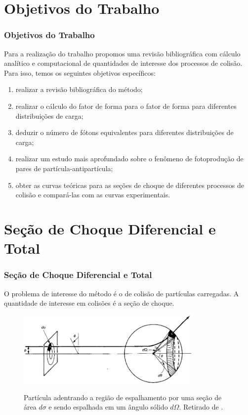 \documentclass[xcolor=dvipsnames]{beamer}
\begin{document}
\section{Objetivos do Trabalho}
\begin{frame}
	\frametitle{Objetivos do Trabalho}
	Para a realização do trabalho propomos uma revisão bibliográfica com cálculo
	analítico e computacional de quantidades de interesse dos processos de
	colisão. Para isso, temos os seguintes objetivos específicos:
	\begin{enumerate}
		\item realizar a revisão bibliográfica do método;
		\item realizar o cálculo do fator de forma para o fator de forma
			para diferentes distribuições de carga;
		\item deduzir o número de fótons equivalentes para diferentes
			distribuições de carga;
		\item realizar um estudo mais aprofundado sobre o fenômeno de
			fotoprodução de pares de partícula-antipartícula;
		\item obter as curvas teóricas para as seções de choque de diferentes
			processos de colisão e compará-las com as curvas experimentais.
	\end{enumerate}

\end{frame}

\section{Seção de Choque Diferencial e Total}
\begin{frame}
	\frametitle{Seção de Choque Diferencial e Total}
	O problema de interesse do método é o de colisão de partículas carregadas.
	A quantidade de interesse em colisões é a seção de choque.
	\begin{figure}[h]
		\centering
		\includegraphics[width=0.8\textwidth]{./figs/cross_section.jpeg}
		\label{fig_cross_section}
		\caption{Partícula adentrando a região de espalhamento por uma
		seção de área $d\sigma$ e  sendo espalhada em um ângulo sólido
		$d\Omega$. Retirado de \cite{griffiths_particle}.}
	\end{figure}
\end{frame}
\end{document}
